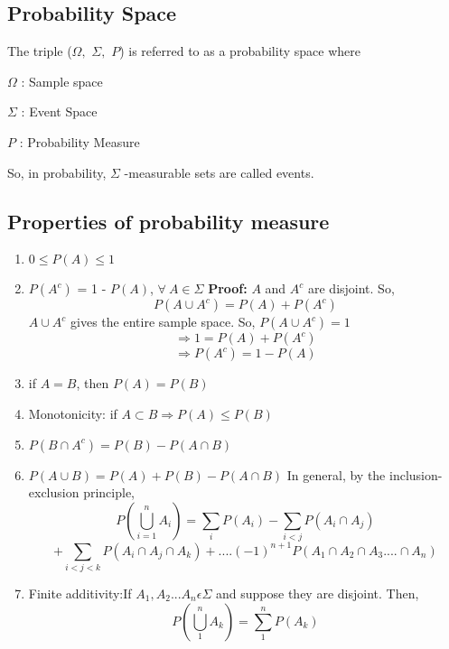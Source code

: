\documentclass{article}
\begin{document}
\subsection{Probability Space}

The triple ($\Omega,$ $\Sigma,$ $P$) is referred to as a probability space where

$\Omega$ : Sample space

$\Sigma$ : Event Space

$P$ : Probability Measure

So, in probability, $\Sigma$ -measurable sets are called events.

\subsection{Properties of probability measure}
\begin{enumerate}
    \item $0 \le P(A) \le 1$
    \item $P(A^{c})$ = 1 - $P(A)$, $\forall\  A \in \Sigma$
    \newline \textbf{Proof: } $A$ and $A^c$ are disjoint. So,
    $$ P(A \cup A^c) = P(A) + P(A^c)$$
    $A \cup A^c$ gives the entire sample space. So, $P(A \cup A^c) = 1$
    $$\Rightarrow 1 = P(A) + P(A^c)$$
    $$\Rightarrow P(A^c) = 1 - P(A)$$
    \item if $A=B$, then $P(A) = P(B)$
    \item Monotonicity: if $A \subset B \Rightarrow P(A) \le P(B)$
    \item $P(B\cap A^{c}) = P(B) - P(A\cap B)$
    \item $P(A\cup B) = P(A) + P(B) - P(A\cap B)$
    \newline \newline In general, by the inclusion-exclusion principle,
    $$P(\bigcup \limits_{i=1}^nA_i) = \sum \limits_iP(A_i) - \sum \limits_{i<j}P(A_i \cap A_j)$$ 
    $$ + \sum \limits_{i<j<k}P(A_i \cap A_j \cap A_k) + ....(-1)^{n+1}P(A_1 \cap A_2 \cap A_3....\cap A_n)$$
    \item Finite additivity:\hfill If $A_{1}, A_{2} ... A_{n} \epsilon \Sigma$ and suppose they are disjoint. Then,
    $$P(\bigcup_{1}^{n} {A_k}) = \sum_{1}^{n}P(A_k)$$
\end{enumerate}
\end{document}
